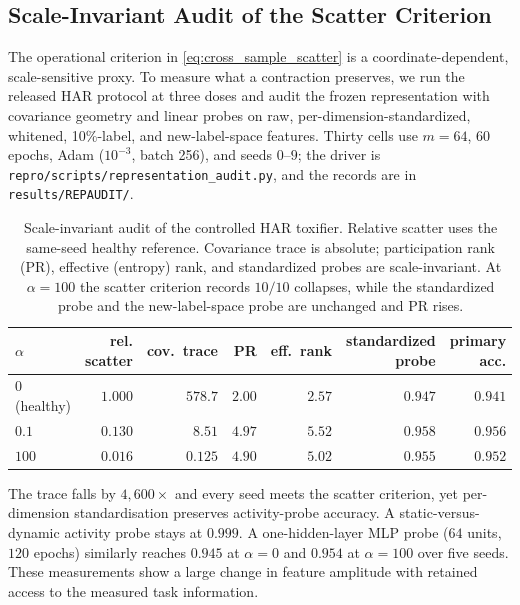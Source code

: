 \documentclass{article}
\begin{document}
\subsection{Scale-Invariant Audit of the Scatter Criterion}\label{app:scale_audit}

The operational criterion in \eqref{eq:cross_sample_scatter} is a coordinate-dependent, scale-sensitive proxy. To measure what a contraction preserves, we run the released HAR protocol at three doses and audit the frozen representation with covariance geometry and linear probes on raw, per-dimension-standardized, whitened, 10\%-label, and new-label-space features. Thirty cells use $m=64$, 60 epochs, Adam ($10^{-3}$, batch 256), and seeds $0$--$9$; the driver is \texttt{repro/scripts/representation\_audit.py}, and the records are in \texttt{results/REPAUDIT/}.

\begin{table}[h]
\centering
\caption{Scale-invariant audit of the controlled HAR toxifier. Relative scatter uses the same-seed healthy reference. Covariance trace is absolute; participation rank (PR), effective (entropy) rank, and standardized probes are scale-invariant. At $\alpha=100$ the scatter criterion records $10/10$ collapses, while the standardized probe and the new-label-space probe are unchanged and PR rises.}
\label{tab:scale_audit}
\footnotesize
\begin{tabular}{lrrrrrr}
\toprule
$\alpha$ & rel. scatter & cov.\ trace & PR & eff.\ rank & standardized probe & primary acc. \\
\midrule
$0$ (healthy) & $1.000$ & $578.7$ & $2.00$ & $2.57$ & $0.947$ & $0.941$ \\
$0.1$ & $0.130$ & $8.51$ & $4.97$ & $5.52$ & $0.958$ & $0.956$ \\
$100$ & $0.016$ & $0.125$ & $4.90$ & $5.02$ & $0.955$ & $0.952$ \\
\bottomrule
\end{tabular}
\end{table}

The trace falls by $4{,}600\times$ and every seed meets the scatter criterion, yet per-dimension standardisation preserves activity-probe accuracy. A static-versus-dynamic activity probe stays at $0.999$. A one-hidden-layer MLP probe ($64$ units, $120$ epochs) similarly reaches $0.945$ at $\alpha=0$ and $0.954$ at $\alpha=100$ over five seeds. These measurements show a large change in feature amplitude with retained access to the measured task information.
\end{document}
